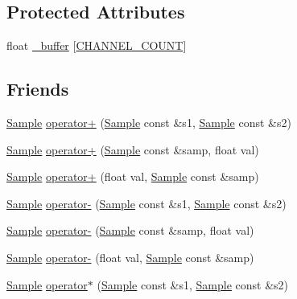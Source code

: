 \subsection*{Protected Attributes}
\begin{DoxyCompactItemize}
\item 
float \hyperlink{classDSG_1_1Signal_1_1Sample_a5f07b8a0b840b20d23d9c6a2b0e5c657}{\+\_\+buffer} \mbox{[}\hyperlink{Sample_8h_a29e42927003b0aa647ee45965f4ccb07}{C\+H\+A\+N\+N\+E\+L\+\_\+\+C\+O\+U\+N\+T}\mbox{]}
\end{DoxyCompactItemize}
\subsection*{Friends}
\begin{DoxyCompactItemize}
\item 
\hyperlink{classDSG_1_1Signal_1_1Sample}{Sample} \hyperlink{classDSG_1_1Signal_1_1Sample_a2fd9547bca678d483b7678ff2d19c7bf}{operator+} (\hyperlink{classDSG_1_1Signal_1_1Sample}{Sample} const \&s1, \hyperlink{classDSG_1_1Signal_1_1Sample}{Sample} const \&s2)
\item 
\hyperlink{classDSG_1_1Signal_1_1Sample}{Sample} \hyperlink{classDSG_1_1Signal_1_1Sample_a001ec49a9676fe37d9dfbb6f0b27127d}{operator+} (\hyperlink{classDSG_1_1Signal_1_1Sample}{Sample} const \&samp, float val)
\item 
\hyperlink{classDSG_1_1Signal_1_1Sample}{Sample} \hyperlink{classDSG_1_1Signal_1_1Sample_a9a5ae50b9096d1c778d6a676b562e11a}{operator+} (float val, \hyperlink{classDSG_1_1Signal_1_1Sample}{Sample} const \&samp)
\item 
\hyperlink{classDSG_1_1Signal_1_1Sample}{Sample} \hyperlink{classDSG_1_1Signal_1_1Sample_a4539e34cec889979677229c5ddf6eaf1}{operator-\/} (\hyperlink{classDSG_1_1Signal_1_1Sample}{Sample} const \&s1, \hyperlink{classDSG_1_1Signal_1_1Sample}{Sample} const \&s2)
\item 
\hyperlink{classDSG_1_1Signal_1_1Sample}{Sample} \hyperlink{classDSG_1_1Signal_1_1Sample_a30c04ca57e9f947cdd68041231676acc}{operator-\/} (\hyperlink{classDSG_1_1Signal_1_1Sample}{Sample} const \&samp, float val)
\item 
\hyperlink{classDSG_1_1Signal_1_1Sample}{Sample} \hyperlink{classDSG_1_1Signal_1_1Sample_a27b97bc41eae03efe5f4157bdc3e42b2}{operator-\/} (float val, \hyperlink{classDSG_1_1Signal_1_1Sample}{Sample} const \&samp)
\item 
\hyperlink{classDSG_1_1Signal_1_1Sample}{Sample} \hyperlink{classDSG_1_1Signal_1_1Sample_ae6e21a0672b773c8ae0537410c48a385}{operator$\ast$} (\hyperlink{classDSG_1_1Signal_1_1Sample}{Sample} const \&s1, \hyperlink{classDSG_1_1Signal_1_1Sample}{Sample} const \&s2)

\end{DoxyCompactItemize}

